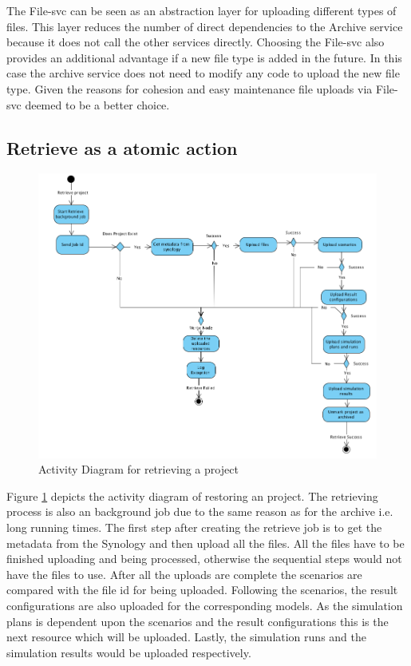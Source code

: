 The File-svc can be seen as an abstraction layer for uploading different types of files. This layer reduces the number of direct dependencies to the Archive
service because it does not call the other services directly. Choosing the File-svc also provides an additional advantage if a new file type is added in the future.
In this case the archive service does not need to modify any code to upload the new file type. Given the reasons for cohesion and easy maintenance file uploads
via File-svc deemed to be a better choice. 

\subsection{Retrieve as a atomic action}
\begin{figure}[H]
    \centering \includegraphics[scale=0.45]{grafiken/restoreActivity.png}
    \caption{Activity Diagram for retrieving a project}
    \label{fig:activityRestore}
\end{figure}

Figure \ref{fig:activityRestore} depicts the activity diagram of restoring an project. The retrieving process is also an background job due to the same reason
as for the archive i.e. long running times. The first step after creating the retrieve job is to get the metadata from the Synology and then upload all the files.
All the files have to be finished uploading and being processed, otherwise the sequential steps would not have the files to use. After all the uploads are complete
the scenarios are compared with the file id for being uploaded. Following the scenarios, the result configurations are also uploaded for the corresponding models.
As the simulation plans is dependent upon the scenarios and the result configurations this is the next resource which will be uploaded. Lastly, the simulation runs
and the simulation results would be uploaded respectively. 

